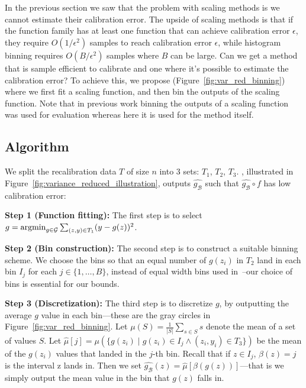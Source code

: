 \section{\Ourcal{}}
\label{sec:calibrating_models}

In the previous section we saw that the problem with scaling methods is we cannot estimate their calibration error. The upside of scaling methods is that if the function family has at least one function that can achieve calibration error $\epsilon$, they require $O(1/\epsilon^2)$ samples to reach calibration error $\epsilon$, while histogram binning requires $O(B/\epsilon^2)$ samples where $B$ can be large. Can we get a method that is sample efficient to calibrate and one where it's possible to estimate the calibration error? To achieve this, we propose \ourcal{} (Figure~\ref{fig:var_red_binning}) where we first fit a scaling function, and then bin the outputs of the scaling function. Note that in previous work binning the outputs of a scaling function was used for evaluation whereas here it is used for the method itself.

\subsection{Algorithm}

We split the recalibration data $T$ of size $n$ into 3 sets: $T_1$, $T_2$, $T_3$. \Ourcal{}, illustrated in Figure~\ref{fig:variance_reduced_illustration}, outputs $\hat{g_{\mathcal{B}}}$ such that $\hat{g_{\mathcal{B}}} \circ f$ has low calibration error:

\textbf{Step 1 (Function fitting):} The first step is to select $g = \mathop{\mbox{argmin}}_{g \in \mathcal{G}} \sum_{(z, y) \in T_1} (y - g(z))^2$.

\textbf{Step 2 (Bin construction):} The second step is to construct a suitable binning scheme. We choose the bins so that an equal number of $g(z_i)$ in $T_2$ land in each bin $I_j$ for each $j \in \{1, \dots, B\}$, instead of equal width bins used in~\cite{guo2017calibration}--our choice of bins is essential for our bounds.

\textbf{Step 3 (Discretization):} The third step is to discretize $g$, by outputting the average $g$ value in each bin---these are the gray circles in Figure~\ref{fig:var_red_binning}. Let $\mu(S) = \frac{1}{|S|} \sum_{s \in S} s$ denote the mean of a set of values $S$.
Let $\hat{\mu}[j] = \mu(\{ g(z_i) \; | \; g(z_i) \in I_j \wedge (z_i, y_i) \in T_3 \})$ be the mean of the $g(z_i)$ values that landed in the $j$-th bin.
Recall that if $z \in I_j$, $\beta(z) = j$ is the interval z lands in.
Then we set $\hat{g_{\mathcal{B}}}(z) = \hat{\mu}[\beta(g(z))]$---that is we simply output the mean value in the bin that $g(z)$ falls in.

